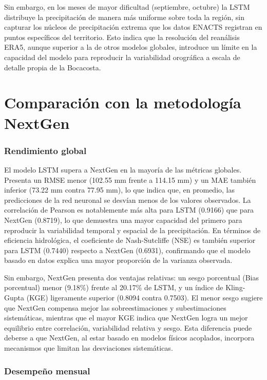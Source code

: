 Sin embargo, en los meses de mayor dificultad (septiembre, octubre) la LSTM distribuye
la precipitación de manera más uniforme sobre toda la región, sin capturar los núcleos
de precipitación extrema que los datos ENACTS registran en puntos específicos del
territorio. Esto indica que la resolución del reanálisis ERA5, aunque superior a la de
otros modelos globales, introduce un límite en la capacidad del modelo para
reproducir la variabilidad orográfica a escala de detalle propia de la Bocacosta.

\section{Comparación con la metodología NextGen}

\subsubsection*{Rendimiento global}

El modelo LSTM supera a NextGen en la mayoría de las métricas globales. Presenta un RMSE menor (102.55 mm frente a 114.15 mm) y un MAE también inferior (73.22 mm contra 77.95 mm), lo que indica que, en promedio, las predicciones de la red neuronal se desvían menos de los valores observados. La correlación de Pearson es notablemente más alta para LSTM (0.9166) que para NextGen (0.8719), lo que demuestra una mayor capacidad del primero para reproducir la variabilidad temporal y espacial de la precipitación. En términos de eficiencia hidrológica, el coeficiente de Nash-Sutcliffe (NSE) es también superior para LSTM (0.7440) respecto a NextGen (0.6931), confirmando que el modelo basado en datos explica una mayor proporción de la varianza observada.

Sin embargo, NextGen presenta dos ventajas relativas: un sesgo porcentual (Bias porcentual) menor (9.18\%) frente al 20.17\% de LSTM, y un índice de Kling-Gupta (KGE) ligeramente superior (0.8094 contra 0.7503). El menor sesgo sugiere que NextGen compensa mejor las sobreestimaciones y subestimaciones sistemáticas, mientras que el mayor KGE indica que NextGen logra un mejor equilibrio entre correlación, variabilidad relativa y sesgo. Esta diferencia puede deberse a que NextGen, al estar basado en modelos físicos acoplados, incorpora mecanismos que limitan las desviaciones sistemáticas.

\subsubsection*{Desempeño mensual}

